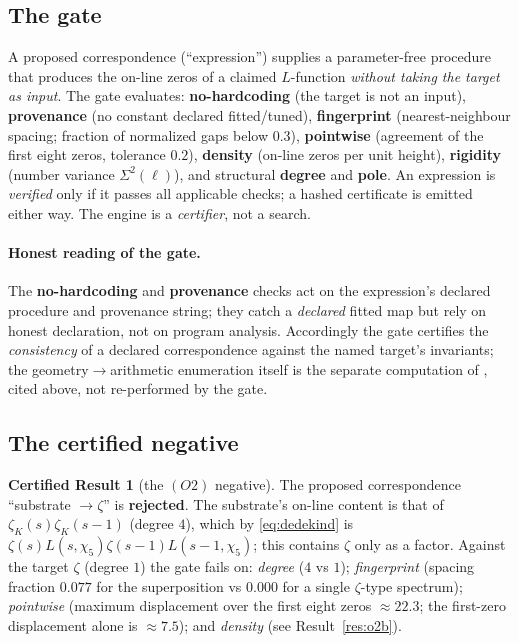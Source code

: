 \documentclass[11pt]{article}
\theoremstyle{definition}
\newtheorem{result}[theorem]{Certified Result}
\newcommand{\zetaK}{\zeta_{K}}
\begin{document}
\subsection{The gate}
A proposed correspondence (``expression'') supplies a parameter-free procedure that
produces the on-line zeros of a claimed $L$-function \emph{without taking the target as
input}. The gate evaluates: \textbf{no-hardcoding} (the target is not an input),
\textbf{provenance} (no constant declared fitted/tuned), \textbf{fingerprint}
(nearest-neighbour spacing; fraction of normalized gaps below $0.3$),
\textbf{pointwise} (agreement of the first eight zeros, tolerance $0.2$),
\textbf{density} (on-line zeros per unit height), \textbf{rigidity} (number variance
$\Sigma^2(\ell)$), and structural \textbf{degree} and \textbf{pole}. An expression is
\emph{verified} only if it passes all applicable checks; a hashed certificate is emitted
either way. The engine is a \emph{certifier}, not a search.

\paragraph{Honest reading of the gate.} The \textbf{no-hardcoding} and
\textbf{provenance} checks act on the expression's declared procedure and provenance
string; they catch a \emph{declared} fitted map but rely on honest declaration, not on
program analysis. Accordingly the gate certifies the \emph{consistency} of a declared
correspondence against the named target's invariants; the geometry$\to$arithmetic
enumeration itself is the separate computation of \cite{IcosianTriad}, cited above, not
re-performed by the gate.

\subsection{The certified negative}
\begin{result}[the $(O2)$ negative]\label{res:o2}
The proposed correspondence ``substrate $\to\zeta$'' is \textbf{rejected}. The
substrate's on-line content is that of $\zetaK(s)\zetaK(s-1)$ (degree $4$), which by
\eqref{eq:dedekind} is $\zeta(s)L(s,\chi_5)\zeta(s-1)L(s-1,\chi_5)$; this contains
$\zeta$ only as a factor. Against the target $\zeta$ (degree $1$) the gate fails on:
\emph{degree} ($4$ vs $1$); \emph{fingerprint} (spacing fraction $0.077$ for the
superposition vs $0.000$ for a single $\zeta$-type spectrum); \emph{pointwise}
(maximum displacement over the first eight zeros $\approx 22.3$; the first-zero
displacement alone is $\approx 7.5$); and \emph{density} (see Result~\ref{res:o2b}).
\end{result}
\end{document}
